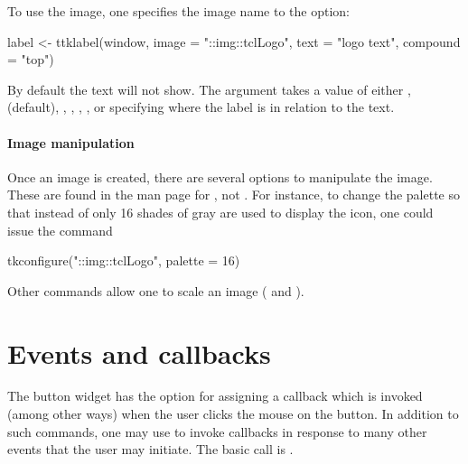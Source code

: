 To use the image, one specifies the image name to the
 option:
\begin{Schunk}
\begin{Sinput}
 label <- ttklabel(window, image = "::img::tclLogo", text = "logo text", 
               compound = "top")
\end{Sinput}
\end{Schunk}

By default the text will not show. The 
argument takes a value of either , 
(default), , , , ,
or  specifying where the label is in relation to the
text.

\paragraph{Image manipulation}
Once an image is created, there are several options to manipulate the
image. These are found in the \TK\/ man page for , not
. For instance, to change the palette so that instead of
 only 16 shades of gray are used to display the icon,
one could issue the command
\begin{Schunk}
\begin{Sinput}
 tkconfigure("::img::tclLogo", palette = 16)
\end{Sinput}
\end{Schunk}
Other commands allow one to scale an image ( and
).




\section{Events and callbacks}
\label{sec:tcltk:overview:events-callbacks}

The button widget has the  option for assigning a
callback which is invoked (among other ways) when the user clicks the
mouse on the button. In addition to such commands, one may use
 to invoke callbacks in response to many other events
that the user may initiate. The basic call is . 

